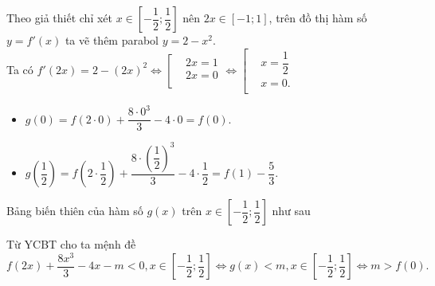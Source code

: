 \begin{ex}
{		Theo giả thiết chỉ xét $ x\in \left[ -\dfrac{1}{2};\dfrac{1}{2} \right]$ nên $2x\in  [-1;1]$, trên đồ thị hàm số $ y=f'(x)$ ta vẽ thêm parabol $y=2-x^2$.\\
		Ta có $f'(2x)=2- (2x)^2 \Leftrightarrow \left[ \begin{aligned}
			& 2x=1 \\
			& 2x=0 \\
		\end{aligned} \right.\Leftrightarrow \left[ \begin{aligned}
			& x=\dfrac{1}{2} \\
			& x=0. \\
		\end{aligned} \right.$
		\begin{itemize}
			\item $g(0)=f( 2\cdot0 )+\dfrac {8\cdot0^3 }{3}-4\cdot0=f(0)$.
			\item $ g\left( \dfrac{1}{2}\right)=f\left(2\cdot\dfrac{1}{2}\right)+\dfrac{8\cdot \left( \dfrac{1}{2}\right)^3}{3}-4\cdot\dfrac{1}{2}=f(1)-\dfrac{5}{3}$.
		\end{itemize}
		Bảng biến thiên của hàm số $ g(x)$ trên $ x\in \left[ -\dfrac{1}{2};\dfrac{1}{2} \right]$ như sau
		\begin{center}
		\end{center}
		Từ YCBT cho ta mệnh đề
		$$f( 2x )+\dfrac{8 x^3 }{3}-4x-m<0,x\in \left[ -\dfrac{1}{2};\dfrac{1}{2} \right]\Leftrightarrow g(x)<m,x\in \left[ -\dfrac{1}{2};\dfrac{1}{2} \right]\Leftrightarrow m>f(0).$$
	}
\end{ex}
